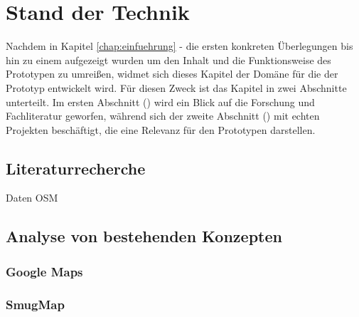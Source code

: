 \documentclass[../Bachelorarbeit.tex]{subfiles}
\begin{document}
\chapter{Stand der Technik}
\label{chap:analyse}

Nachdem in Kapitel \ref{chap:einfuehrung} -  die ersten konkreten Überlegungen bis hin zu einem  aufgezeigt wurden um den Inhalt und die Funktionsweise des Prototypen zu umreißen, widmet sich dieses Kapitel der Domäne für die der Prototyp entwickelt wird.
Für diesen Zweck ist das Kapitel in zwei Abschnitte unterteilt. 
Im ersten Abschnitt () wird ein Blick auf die Forschung und Fachliteratur geworfen, während sich der zweite Abschnitt () mit echten Projekten beschäftigt, die eine Relevanz für den Prototypen darstellen.


\section{Literaturrecherche}
\label{chap:analyse:sec:sota}





Daten OSM


\section{Analyse von bestehenden Konzepten}
\label{chap:analyse:sec:analyBestehendeKonz}


\subsection{Google Maps}
\label{chap:analyse:sec:sota:sec:google_maps}

\subsection{SmugMap}
\end{document}
